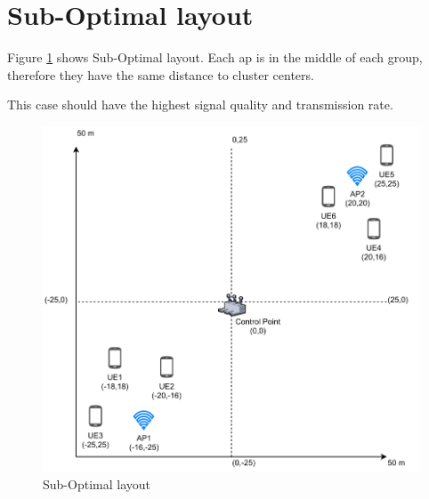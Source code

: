 \section{Sub-Optimal layout}\label{sub-optimal-layout}

Figure \ref{fig:sub-optimal-layout} shows Sub-Optimal layout. Each \gls{ap} is in the middle of each group, therefore
they have the same distance to cluster centers.

This case should have the highest signal quality and transmission rate.

\begin{figure}[H]
	\centering
	\includegraphics[width=\linewidth,keepaspectratio]{images/05-cases-description-Sub-optimal.pdf}
\caption{Sub-Optimal layout}
\label{fig:sub-optimal-layout}
\end{figure}
